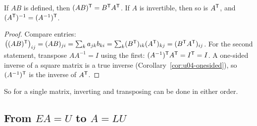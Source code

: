 \begin{theorem}\label{thm:u05-transpose-product}
If $AB$ is defined, then $(AB)^{\mathsf{T}}=B^{\mathsf{T}} A^{\mathsf{T}}$. If $A$ is invertible, then so is $A^{\mathsf{T}}$, and
$(A^{\mathsf{T}})^{-1}=(A^{-1})^{\mathsf{T}}$.
\end{theorem}

\begin{proof}
Compare entries: $\bigl((AB)^{\mathsf{T}}\bigr)_{ij}=(AB)_{ji}=\sum_k a_{jk}b_{ki}
=\sum_k (B^{\mathsf{T}})_{ik}(A^{\mathsf{T}})_{kj}=(B^{\mathsf{T}} A^{\mathsf{T}})_{ij}$. For the second statement, transpose
$AA^{-1}=I$ using the first: $(A^{-1})^{\mathsf{T}} A^{\mathsf{T}}=I^{\mathsf{T}}=I$. A one-sided inverse of a square matrix
is a true inverse (Corollary~\ref{cor:u04-onesided}), so $(A^{-1})^{\mathsf{T}}$ is the inverse of $A^{\mathsf{T}}$.
\end{proof}

So for a single matrix, inverting and transposing can be done in either order.

\subsection{From \texorpdfstring{\(EA=U\)}{EA = U} to \texorpdfstring{\(A=LU\)}{A = LU}}

